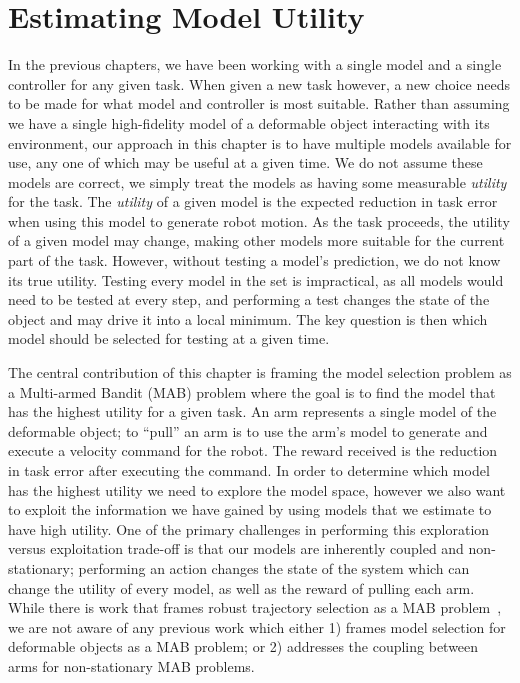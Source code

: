 \chapter{Estimating Model Utility}
\label{chap:mab}

In the previous chapters, we have been working with a single model and a single controller for any given task. When given a new task however, a new choice needs to be made for what model and controller is most suitable. Rather than assuming we have a single high-fidelity model of a deformable object interacting with its environment, our approach in this chapter is to have multiple models available for use, any one of which may be useful at a given time. We do not assume these models are correct, we simply treat the models as having some measurable \textit{utility} for the task. The \textit{utility} of a given model is the expected reduction in task error when using this model to generate robot motion. As the task proceeds, the utility of a given model may change, making other models more suitable for the current part of the task. However, without testing a model's prediction, we do not know its true utility. Testing every model in the set is impractical, as all models would need to be tested at every step, and performing a test changes the state of the object and may drive it into a local minimum. The key question is then which model should be selected for testing at a given time.

The central contribution of this chapter is framing the model selection problem as a Multi-armed Bandit (MAB) problem where the goal is to find the model that has the highest utility for a given task. An arm represents a single model of the deformable object; to ``pull'' an arm is to use the arm's model to generate and execute a velocity command for the robot. The reward received is the reduction in task error after executing the command. In order to determine which model has the highest utility we need to explore the model space, however we also want to exploit the information we have gained by using models that we estimate to have high utility. One of the primary challenges in performing this exploration versus exploitation trade-off is that our models are inherently coupled and non-stationary; performing an action changes the state of the system which can change the utility of every model, as well as the reward of pulling each arm. While there is work that frames robust trajectory selection as a MAB problem~\cite{Koval2015}, we are not aware of any previous work which either 1) frames model selection for deformable objects as a MAB problem; or 2) addresses the coupling between arms for non-stationary MAB problems.

